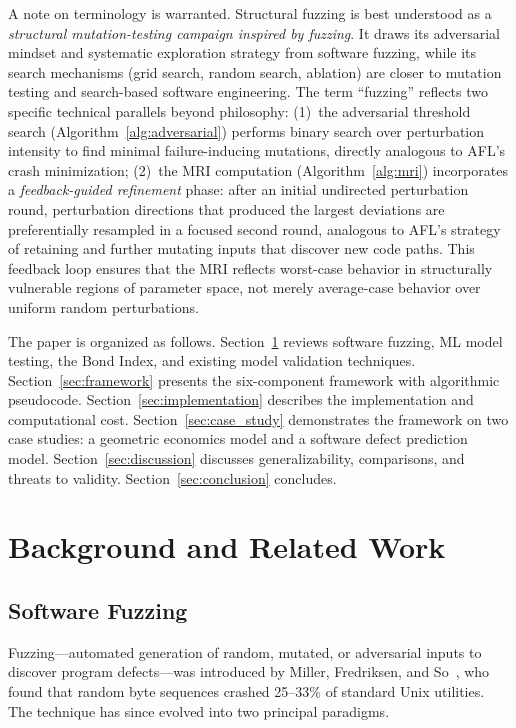 \documentclass[manuscript,review,anonymous]{acmart}
\begin{document}
A note on terminology is warranted.
Structural fuzzing is best understood as a \emph{structural mutation-testing campaign inspired by fuzzing}.
It draws its adversarial mindset and systematic exploration strategy from software fuzzing, while its search mechanisms (grid search, random search, ablation) are closer to mutation testing and search-based software engineering.
The term ``fuzzing'' reflects two specific technical parallels beyond philosophy:
(1)~the adversarial threshold search (Algorithm~\ref{alg:adversarial}) performs binary search over perturbation intensity to find minimal failure-inducing mutations, directly analogous to AFL's crash minimization;
(2)~the MRI computation (Algorithm~\ref{alg:mri}) incorporates a \emph{feedback-guided refinement} phase: after an initial undirected perturbation round, perturbation directions that produced the largest deviations are preferentially resampled in a focused second round, analogous to AFL's strategy of retaining and further mutating inputs that discover new code paths.
This feedback loop ensures that the MRI reflects worst-case behavior in structurally vulnerable regions of parameter space, not merely average-case behavior over uniform random perturbations.

The paper is organized as follows.
Section~\ref{sec:background} reviews software fuzzing, ML model testing, the Bond Index, and existing model validation techniques.
Section~\ref{sec:framework} presents the six-component framework with algorithmic pseudocode.
Section~\ref{sec:implementation} describes the implementation and computational cost.
Section~\ref{sec:case_study} demonstrates the framework on two case studies: a geometric economics model and a software defect prediction model.
Section~\ref{sec:discussion} discusses generalizability, comparisons, and threats to validity.
Section~\ref{sec:conclusion} concludes.

\section{Background and Related Work}
\label{sec:background}

\subsection{Software Fuzzing}

Fuzzing---automated generation of random, mutated, or adversarial inputs to discover program defects---was introduced by Miller, Fredriksen, and So~\cite{miller1990}, who found that random byte sequences crashed 25--33\% of standard Unix utilities.
The technique has since evolved into two principal paradigms.
\end{document}
